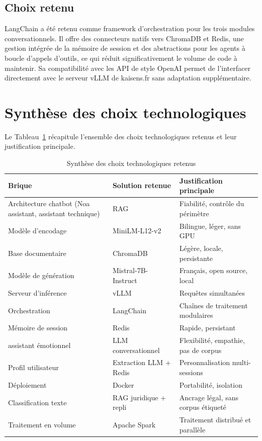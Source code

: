 \subsection{Choix retenu}

LangChain a été retenu comme framework d'orchestration pour les trois modules conversationnels.
Il offre des connecteurs natifs vers ChromaDB et Redis, une gestion intégrée
de la mémoire de session et des abstractions pour les agents à boucle d'appels d'outils,
ce qui réduit significativement le volume de code à maintenir.
Sa compatibilité avec les API de style OpenAI permet de l'interfacer directement
avec le serveur vLLM de kaisens.fr sans adaptation supplémentaire.

\section{Synthèse des choix technologiques}

Le Tableau~\ref{tab:synthese_choix} récapitule l'ensemble des choix technologiques retenus
et leur justification principale.

\vspace{6pt}
\begin{table}[H]
\centering
\caption{Synthèse des choix technologiques retenus}
\label{tab:synthese_choix}
\small
\setlength{\tabcolsep}{4pt}
\begin{tabular}{|p{4.5cm}|p{4cm}|p{6cm}|}
\hline
\textbf{Brique} & \textbf{Solution retenue} & \textbf{Justification principale} \\
\hline
Architecture chatbot (Noa assistant, assistant technique) & RAG & Fiabilité, contrôle du périmètre \\
Modèle d'encodage & MiniLM-L12-v2 & Bilingue, léger, sans GPU \\
Base documentaire & ChromaDB & Légère, locale, persistante \\
Modèle de génération & Mistral-7B-Instruct & Français, open source, local \\
Serveur d'inférence & vLLM & Requêtes simultanées \\
Orchestration & LangChain & Chaînes de traitement modulaires \\
Mémoire de session & Redis & Rapide, persistant \\
assistant émotionnel & LLM conversationnel & Flexibilité, empathie, pas de corpus \\
Profil utilisateur & Extraction LLM + Redis & Personnalisation multi-sessions \\
Déploiement & Docker & Portabilité, isolation \\
Classification texte & RAG juridique + repli & Ancrage légal, sans corpus étiqueté \\
Traitement en volume & Apache Spark & Traitement distribué et parallèle \\
\hline
\end{tabular}
\end{table}

